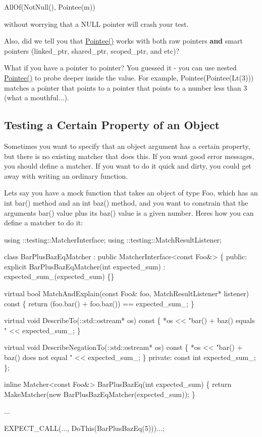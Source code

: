 \begin{DoxyCode}
AllOf(NotNull(), Pointee(m))
\end{DoxyCode}


without worrying that a {\ttfamily N\+U\+LL} pointer will crash your test.

Also, did we tell you that {\ttfamily \hyperlink{namespacetesting_a5122ca3533f3a00f67e146dd81f3b68c}{Pointee()}} works with both raw pointers {\bfseries and} smart pointers ({\ttfamily linked\+\_\+ptr}, {\ttfamily shared\+\_\+ptr}, {\ttfamily scoped\+\_\+ptr}, and etc)?

What if you have a pointer to pointer? You guessed it -\/ you can use nested {\ttfamily \hyperlink{namespacetesting_a5122ca3533f3a00f67e146dd81f3b68c}{Pointee()}} to probe deeper inside the value. For example, {\ttfamily Pointee(Pointee(\+Lt(3)))} matches a pointer that points to a pointer that points to a number less than 3 (what a mouthful...).

\subsection*{Testing a Certain Property of an Object}

Sometimes you want to specify that an object argument has a certain property, but there is no existing matcher that does this. If you want good error messages, you should define a matcher. If you want to do it quick and dirty, you could get away with writing an ordinary function.

Let\textquotesingle{}s say you have a mock function that takes an object of type {\ttfamily Foo}, which has an {\ttfamily int bar()} method and an {\ttfamily int baz()} method, and you want to constrain that the argument\textquotesingle{}s {\ttfamily bar()} value plus its {\ttfamily baz()} value is a given number. Here\textquotesingle{}s how you can define a matcher to do it\+:


\begin{DoxyCode}
using ::testing::MatcherInterface;
using ::testing::MatchResultListener;

class BarPlusBazEqMatcher : public MatcherInterface<const Foo&> \{
 public:
  explicit BarPlusBazEqMatcher(int expected\_sum)
      : expected\_sum\_(expected\_sum) \{\}

  virtual bool MatchAndExplain(const Foo& foo,
                               MatchResultListener* listener) const \{
    return (foo.bar() + foo.baz()) == expected\_sum\_;
  \}

  virtual void DescribeTo(::std::ostream* os) const \{
    *os << "bar() + baz() equals " << expected\_sum\_;
  \}

  virtual void DescribeNegationTo(::std::ostream* os) const \{
    *os << "bar() + baz() does not equal " << expected\_sum\_;
  \}
 private:
  const int expected\_sum\_;
\};

inline Matcher<const Foo&> BarPlusBazEq(int expected\_sum) \{
  return MakeMatcher(new BarPlusBazEqMatcher(expected\_sum));
\}

...

  EXPECT\_CALL(..., DoThis(BarPlusBazEq(5)))...;
\end{DoxyCode}


